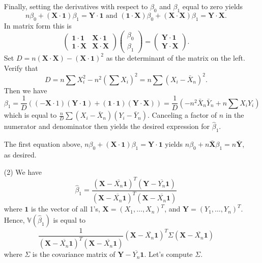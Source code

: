 \documentclass[10pt]{article}
\newcommand{\V}{\mathbb{V}}
\begin{document}
\begin{enumerate}
Finally, setting the derivatives with respect to $\beta_0$ and $\beta_1$ equal
to zero yields
\[
    n\beta_0 + (\mathbf X\cdot \mathbf 1)\beta_1 = \mathbf Y \cdot \mathbf 1
    \text{ and }
    (\mathbf 1 \cdot \mathbf X)\beta_0+ (\mathbf X \cdot \mathbf X)\beta_1 =
    \mathbf Y \cdot \mathbf X.
\]
In matrix form this is
\[
    \begin{pmatrix}
        \mathbf 1 \cdot \mathbf 1 & \mathbf X \cdot \mathbf 1 \\
        \mathbf 1 \cdot \mathbf X & \mathbf X \cdot \mathbf X
    \end{pmatrix}
    \begin{pmatrix}
        \beta_0 \\ \beta_1
    \end{pmatrix} =
    \begin{pmatrix}
    \mathbf Y\cdot \mathbf 1 \\ \mathbf Y\cdot \mathbf X
    \end{pmatrix}.
\]
Set $D = n(\mathbf X\cdot \mathbf X) - (\mathbf X \cdot \mathbf 1)^2$ as the
determinant of the matrix on the left. Verify that
\[
    D=n\sum X_i^2 - n^2\left(\sum X_i\right)^2 = n\sum(X_i - \bar X_n)^2.
\]
Then we have
\[
    \beta_1 = \frac{1}{D}((-\mathbf X \cdot 1)(\mathbf Y \cdot \mathbf 1)
    + (\mathbf 1 \cdot \mathbf 1)(\mathbf Y \cdot \mathbf X)) =
    \frac{1}{D}\left(-n^2\bar X_n \bar Y_n + n\sum X_iY_i\right)
\]
which is equal to
$\frac{n}{D}\sum(X_i - \bar X_n)(Y_i - \bar Y_n)$.
Canceling a factor of $n$ in the numerator and denominator then yields the desired
expression for $\hat \beta_1$.

The first equation above,
$n\beta_0 + (\mathbf X\cdot \mathbf 1)\beta_1 = \mathbf Y \cdot \mathbf 1$ yields
$n\beta_0 + n\bar{\mathbf X}\beta_1 = n\bar{\mathbf Y}$, as desired.

\item[(2)]
We have
\[
\hat \beta_1 = \frac{(\mathbf X - \overline{X_n}\mathbf 1)^T
(\mathbf Y - \overline{Y_n}\mathbf 1)}{(\mathbf X - \overline{X_n}\mathbf 1)^T
(\mathbf X - \overline{X_n}\mathbf 1)}
\]
where $\mathbf 1$ is the vector of all 1's, $\mathbf X=(X_1,\ldots,X_n)^T$,
and $\mathbf Y=(Y_1,\ldots,Y_n)^T$. Hence, $\V(\hat \beta_1)$ is equal to
\[
\frac{1}{(\mathbf X - \overline{X_n}\mathbf 1)^T
(\mathbf X - \overline{X_n}\mathbf 1)}
(\mathbf X - \overline{X_n}\mathbf 1)^T \Sigma (\mathbf X - \overline{X_n}\mathbf 1)
\]
where $\Sigma$ is the covariance matrix of $\mathbf Y - \overline{Y_n} \mathbf 1$.
Let's compute $\Sigma$.


\end{enumerate}
\end{document}
